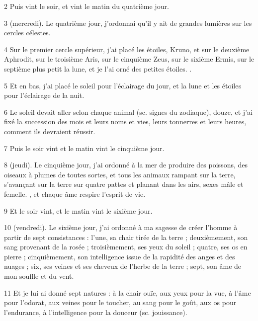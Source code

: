 \par 2 Puis vint le soir, et vint le matin du quatrième jour.

\par 3 (mercredi). Le quatrième jour, j'ordonnai qu'il y ait de grandes lumières sur les cercles célestes.

\par 4 Sur le premier cercle supérieur, j'ai placé les étoiles, Kruno, et sur le deuxième Aphrodit, sur le troisième Aris, sur le cinquième Zeus, sur le sixième Ermis, sur le septième plus petit la lune, et je l'ai orné des petites étoiles. .

\par 5 Et en bas, j'ai placé le soleil pour l'éclairage du jour, et la lune et les étoiles pour l'éclairage de la nuit.

\par 6 Le soleil devait aller selon chaque animal (sc. signes du zodiaque), douze, et j'ai fixé la succession des mois et leurs noms et vies, leurs tonnerres et leurs heures, comment ils devraient réussir.

\par 7 Puis le soir vint et le matin vint le cinquième jour.

\par 8 (jeudi). Le cinquième jour, j'ai ordonné à la mer de produire des poissons, des oiseaux à plumes de toutes sortes, et tous les animaux rampant sur la terre, s'avançant sur la terre sur quatre pattes et planant dans les airs, sexes mâle et femelle. , et chaque âme respire l'esprit de vie.

\par 9 Et le soir vint, et le matin vint le sixième jour.

\par 10 (vendredi). Le sixième jour, j'ai ordonné à ma sagesse de créer l'homme à partir de sept consistances : l'une, sa chair tirée de la terre ; deuxièmement, son sang provenant de la rosée ; troisièmement, ses yeux du soleil ; quatre, ses os en pierre ; cinquièmement, son intelligence issue de la rapidité des anges et des nuages ; six, ses veines et ses cheveux de l'herbe de la terre ; sept, son âme de mon souffle et du vent.

\par 11 Et je lui ai donné sept natures : à la chair ouïe, aux yeux pour la vue, à l'âme pour l'odorat, aux veines pour le toucher, au sang pour le goût, aux os pour l'endurance, à l'intelligence pour la douceur (sc. jouissance).

